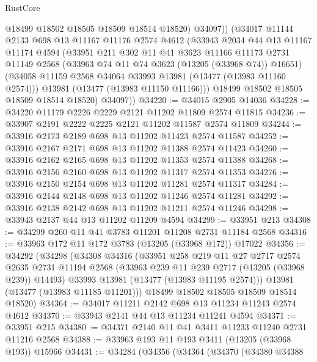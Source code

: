 \begin{lexlean}{RustCore}
\begin{coremodule}
            @18499
            @18502
            @18505
            @18509
            @18514
            @18520)
          @34097))
      (@34017
        @11144
        @2133
        @698
        @13
        @11167
        @11176
        @2574
        @4612
        (@33943
          @2034
          @44
          @13
          @11167
          @11174
          @4594
          (@33951
            @211
            @302
            @11
            @41
            @3623
            @11166
            @11173
            @2731
            @11149
            @2568
            (@33963 @74 @11 @74 @3623 (@13205 (@33968 @74)) @16651)
            (@34058 @11159 @2568 @34064 @33993 @13981 (@13477 (@13983 @11160 @2574)))
            @13981
            (@13477 (@13983 @11150 @11166)))
          @18499
          @18502
          @18505
          @18509
          @18514
          @18520)
        @34097))
@34220 := @34015 @2905 @14036
@34228 := @34220 @11179 @2226 @2229 @2121 @11202 @11809 @2574 @11815
@34236 := @33907 @2191 @2222 @2225 @2121 @11202 @11587 @2574 @11809
@34244 := @33916 @2173 @2189 @698 @13 @11202 @11423 @2574 @11587
@34252 := @33916 @2167 @2171 @698 @13 @11202 @11388 @2574 @11423
@34260 := @33916 @2162 @2165 @698 @13 @11202 @11353 @2574 @11388
@34268 := @33916 @2156 @2160 @698 @13 @11202 @11317 @2574 @11353
@34276 := @33916 @2150 @2154 @698 @13 @11202 @11281 @2574 @11317
@34284 := @33916 @2144 @2148 @698 @13 @11202 @11246 @2574 @11281
@34292 := @33916 @2138 @2142 @698 @13 @11202 @11211 @2574 @11246
@34298 := @33943 @2137 @44 @13 @11202 @11209 @4594
@34299 := @33951 @213
@34308 := @34299 @260 @11 @41 @3783 @11201 @11208 @2731 @11184 @2568
@34316 := @33963 @172 @11 @172 @3783 (@13205 (@33968 @172)) @17022
@34356 := @34292
    (@34298
      (@34308
        @34316
        (@33951
          @258
          @219
          @11
          @27
          @2717
          @2574
          @2635
          @2731
          @11194
          @2568
          (@33963 @239 @11 @239 @2717 (@13205 (@33968 @239)) @14493)
          @33993
          @13981
          (@13477 (@13983 @11195 @2574)))
        @13981
        (@13477 (@13983 @11185 @11201)))
      @18499
      @18502
      @18505
      @18509
      @18514
      @18520)
@34364 := @34017 @11211 @2142 @698 @13 @11234 @11243 @2574 @4612
@34370 := @33943 @2141 @44 @13 @11234 @11241 @4594
@34371 := @33951 @215
@34380 := @34371 @2140 @11 @41 @3411 @11233 @11240 @2731 @11216 @2568
@34388 := @33963 @193 @11 @193 @3411 (@13205 (@33968 @193)) @15966
@34431 := @34284
    (@34356
      (@34364
        (@34370
          (@34380
            @34388

\end{coremodule}
\end{lexlean}

